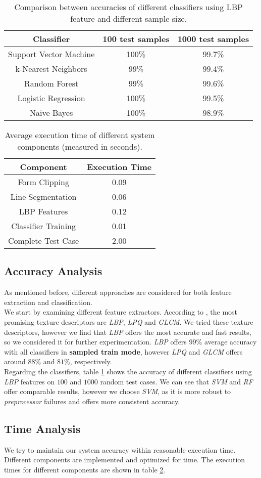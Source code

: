 \begin{table}[h!]
\centering
\begin{tabular}{||c | c | c||}
 \hline
 Classifier & 100 test samples & 1000 test samples \\ [0.5ex] 
 \hline\hline
 Support Vector Machine & 100\% & 99.7\% \\ 
 \hline
 k-Nearest Neighbors & 99\% & 99.4\% \\
 \hline
 Random Forest & 99\% & 99.6\% \\
 \hline
 Logistic Regression & 100\% & 99.5\% \\
 \hline
 Naive Bayes & 100\% & 98.9\% \\ [1ex] 
 \hline
\end{tabular}
\caption{Comparison between accuracies of different classifiers using LBP feature and different sample size.}
\label{table:1}
\end{table}

\begin{table}[h!]
\centering
\begin{tabular}{||c | c||}
 \hline
 Component & Execution Time \\ [0.5ex] 
 \hline\hline
 Form Clipping & 0.09 \\ 
 \hline
 Line Segmentation & 0.06 \\
 \hline
 LBP Features & 0.12 \\
 \hline
 Classifier Training & 0.01 \\
 \hline
 Complete Test Case & 2.00 \\ [1ex] 
 \hline
\end{tabular}
\caption{Average execution time of different system components (measured in seconds).}
\label{table:2}
\end{table}

\subsection{Accuracy Analysis}
As mentioned before, different approaches are considered for both feature extraction and classification. \\
We start by examining different feature extractors. According to \cite{c1}, the most promising texture descriptors are \emph{LBP}, \emph{LPQ} and \emph{GLCM}. We tried these texture descriptors, however we find that \emph{LBP} offers the most accurate and fast results, so we considered it for further experimentation. \emph{LBP} offers $99\%$ average accuracy with all classifiers in \textbf{sampled train mode}, however \emph{LPQ} and \emph{GLCM} offers around $88\%$ and $81\%$, respectively. \\
Regarding the classifiers, table \ref{table:1} shows the accuracy of different classifiers using \emph{LBP} features on $100$ and $1000$ random test cases. We can see that \emph{SVM} and \emph{RF} offer comparable results, however we choose \emph{SVM}, as it is more robust to \emph{preprocessor} failures and offers more consistent accuracy.

\subsection{Time Analysis}
We try to maintain our system accuracy within reasonable execution time. Different components are implemented and optimized for time. The execution times for different components are shown in table \ref{table:2}.
